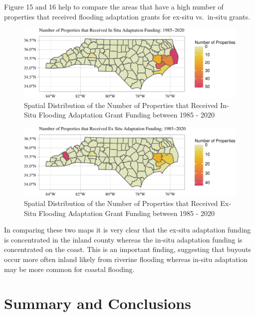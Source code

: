 \documentclass[
  12pt,
]{article}
\begin{document}
\newpage

Figure 15 and 16 help to compare the areas that have a high number of
properties that received flooding adaptation grants for ex-situ
vs.~in-situ grants.

\begin{figure}
\centering
\includegraphics{finalreport_files/figure-latex/unnamed-chunk-29-1.pdf}
\caption{Spatial Distribution of the Number of Properties that Received
In-Situ Flooding Adaptation Grant Funding between 1985 - 2020}
\end{figure}

\newpage

\begin{figure}
\centering
\includegraphics{finalreport_files/figure-latex/unnamed-chunk-30-1.pdf}
\caption{Spatial Distribution of the Number of Properties that Received
Ex-Situ Flooding Adaptation Grant Funding between 1985 - 2020}
\end{figure}

In comparing these two maps it is very clear that the ex-situ adaptation
funding is concentrated in the inland county whereas the in-situ
adaptation funding is concentrated on the coast. This is an important
finding, suggesting that buyouts occur more often inland likely from
riverine flooding whereas in-situ adaptation may be more common for
coastal flooding.

\newpage

\hypertarget{summary-and-conclusions}{%
\section{Summary and Conclusions}\label{summary-and-conclusions}}
\end{document}
